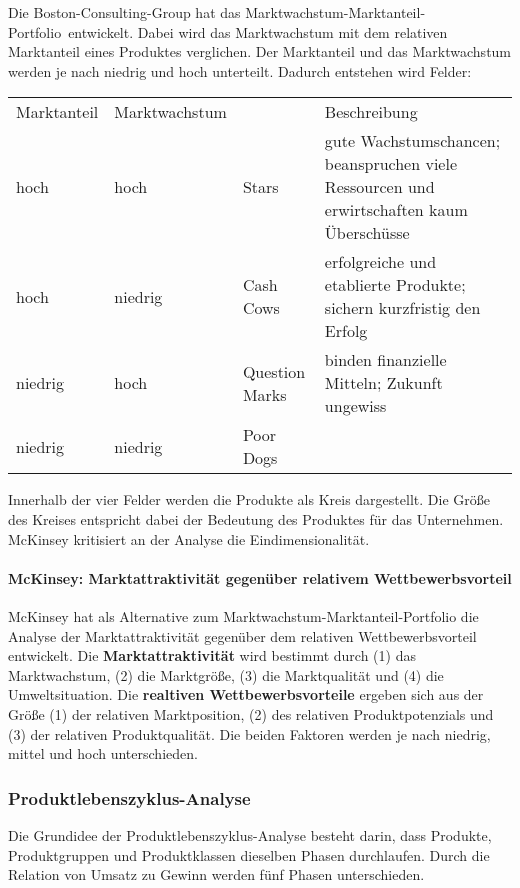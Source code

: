 {Die Boston-Consulting-Group hat das \ql Marktwachstum-Marktanteil-Portfolio\qr\ entwickelt. Dabei wird das Marktwachstum mit dem relativen Marktanteil eines Produktes verglichen. Der Marktanteil und das Marktwachstum werden je nach niedrig und hoch unterteilt. Dadurch entstehen wird Felder:

\begin{tabular}{llll}
Marktanteil & Marktwachstum & & Beschreibung \\
hoch & hoch & Stars & gute Wachstumschancen; beanspruchen viele Ressourcen und erwirtschaften kaum Überschüsse \\
hoch & niedrig & Cash Cows & erfolgreiche und etablierte Produkte; sichern kurzfristig den Erfolg \\
niedrig & hoch & Question Marks & binden finanzielle Mitteln; Zukunft ungewiss \\
niedrig & niedrig & Poor Dogs & & \\
\end{tabular}

Innerhalb der vier Felder werden die Produkte als Kreis dargestellt. Die Größe des Kreises entspricht dabei der Bedeutung des Produktes für das Unternehmen. McKinsey kritisiert an der Analyse die Eindimensionalität.
	
\paragraph{McKinsey: Marktattraktivität gegenüber relativem Wettbewerbsvorteil}

McKinsey hat als Alternative zum Marktwachstum-Marktanteil-Portfolio die Analyse der Marktattraktivität gegenüber dem relativen Wettbewerbsvorteil entwickelt. Die {\bf Marktattraktivität} wird bestimmt durch (1) das Marktwachstum, (2) die Marktgröße, (3) die Marktqualität und (4) die Umweltsituation. Die {\bf realtiven Wettbewerbsvorteile} ergeben sich aus der Größe (1) der relativen Marktposition, (2) des relativen Produktpotenzials und (3) der relativen Produktqualität. Die beiden Faktoren werden je nach niedrig, mittel und hoch unterschieden.

\subsubsection{Produktlebenszyklus-Analyse}

Die Grundidee der Produktlebenszyklus-Analyse besteht darin, dass Produkte, Produktgruppen und Produktklassen dieselben Phasen durchlaufen. Durch die Relation von Umsatz zu Gewinn werden fünf Phasen unterschieden.

}
